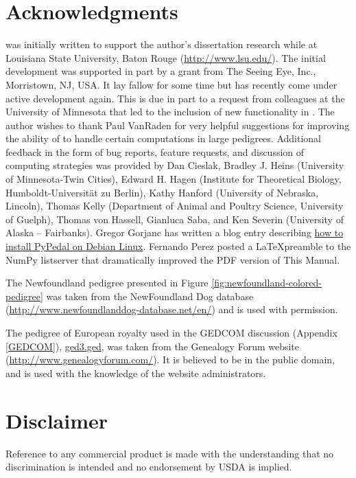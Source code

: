 \section{Acknowledgments}
\PyPedal{} was initially written to support the author's dissertation research while at Louisiana State University, Baton Rouge (\url{http://www.lsu.edu/}).  The initial development was supported in part by a grant from The Seeing Eye, Inc., Morristown, NJ, USA.  It lay fallow for some time but has recently come under active development again.  This is due in part to a request from colleagues at the University of Minnesota that led to the inclusion of new functionality in \PyPedal{}.  The author wishes to thank Paul Van{R}aden for very helpful suggestions for improving the ability of \PyPedal{} to handle certain computations in large pedigrees.  Additional feedback in the form of bug reports, feature requests, and discussion of computing strategies was provided by Dan Cieslak, Bradley J. Heins (University of Minnesota-Twin Cities), Edward H. Hagen (Institute for Theoretical Biology, Humboldt-Universit\"{a}t zu Berlin), Kathy Hanford (University of Nebraska, Lincoln), Thomas Kelly (Department of Animal and Poultry Science, University of Guelph), Thomas von Hassell, Gianluca Saba, and Ken Severin (University of Alaska -- Fairbanks). Gregor Gorjanc has written a blog entry describing \href{http://ggorjan.blogspot.com/2007/04/installing-pypedal-under-debian.html}{how to install PyPedal on Debian Linux}. Fernando Perez posted a \LaTeX preamble to the NumPy listserver that dramatically improved the PDF version of This Manual.

The Newfoundland pedigree presented in Figure \ref{fig:newfoundland-colored-pedigree} was taken from the NewFoundland Dog database (\url{http://www.newfoundlanddog-database.net/en/}) and is used with permission.

The pedigree of European royalty used in the GEDCOM discussion (Appendix \ref{GEDCOM}), \href{http://www.genealogyforum.com/gedcom/gedcom1/ged3.htm}{ged3.ged}, was taken from the Genealogy Forum website (\url{http://www.genealogyforum.com/}). It is believed to be in the public domain, and is used with the knowledge of the website administrators.

\section{Disclaimer}
Reference to any commercial product is made with the understanding that no discrimination is intended and no endorsement by USDA is implied.

